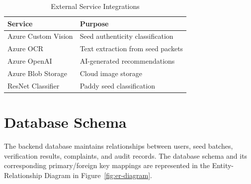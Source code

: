 \begin{table}[H]
\centering
\caption{External Service Integrations}
\label{tab:external-services}
\renewcommand{\arraystretch}{1.3}

\begin{tabularx}{0.95\textwidth}{|p{4cm}|X|}
\hline
\textbf{Service} & \textbf{Purpose} \\
\hline

Azure Custom Vision & Seed authenticity classification \\

\hline

Azure OCR & Text extraction from seed packets \\

\hline

Azure OpenAI & AI-generated recommendations \\

\hline

Azure Blob Storage & Cloud image storage \\

\hline

ResNet Classifier & Paddy seed classification \\

\hline

\end{tabularx}

\end{table}

\section{Database Schema}
\label{sec:database-schema}

The backend database maintains relationships between users, seed batches, verification results, complaints, and audit records. The database schema and its corresponding primary/foreign key mappings are represented in the Entity-Relationship Diagram in Figure~\ref{fig:er-diagram}.


